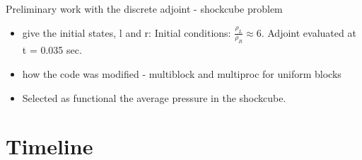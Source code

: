 \documentclass{beamer}
\begin{document}
\begin{frame}
\begin{minipage}[t][1\textheight]{1\textwidth}
\begin{exampleblock}{Preliminary work with the discrete adjoint - shockcube problem}
\begin{figure}
\end{figure}
\vspace{-10pt}
\begin{itemize}
\scriptsize
\item give the initial states, l and r: Initial conditions: $\frac{\rho_L}{\rho_R} \approx 6$. Adjoint evaluated at t = 0.035 sec.
\item how the code was modified - multiblock and multiproc for uniform blocks
\item Selected as functional the average pressure in the shockcube.

\end{itemize}

\end{exampleblock}
\end{minipage}

\end{frame}


\section[Timeline]{Timeline}
\end{document}
